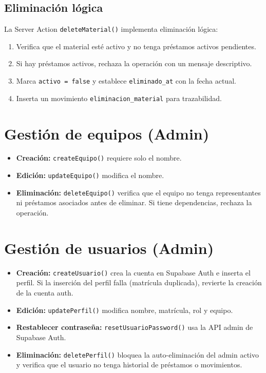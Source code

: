 \documentclass[12pt,a4paper,oneside]{report}
\newcommand{\file}[1]{\texttt{\color{cecyteDark}#1}}
\begin{document}
\subsection{Eliminación lógica}

La Server Action \file{deleteMaterial()} implementa eliminación lógica:

\begin{enumerate}
  \item Verifica que el material esté activo y no tenga préstamos activos pendientes.
  \item Si hay préstamos activos, rechaza la operación con un mensaje descriptivo.
  \item Marca \file{activo = false} y establece \file{eliminado\_at} con la fecha actual.
  \item Inserta un movimiento \file{eliminacion\_material} para trazabilidad.
\end{enumerate}

\section{Gestión de equipos (Admin)}

\begin{itemize}
  \item \textbf{Creación:} \file{createEquipo()} requiere solo el nombre.
  \item \textbf{Edición:} \file{updateEquipo()} modifica el nombre.
  \item \textbf{Eliminación:} \file{deleteEquipo()} verifica que el equipo no tenga representantes ni préstamos asociados antes de eliminar. Si tiene dependencias, rechaza la operación.
\end{itemize}

\section{Gestión de usuarios (Admin)}

\begin{itemize}
  \item \textbf{Creación:} \file{createUsuario()} crea la cuenta en Supabase Auth e inserta el perfil. Si la inserción del perfil falla (matrícula duplicada), revierte la creación de la cuenta auth.
  \item \textbf{Edición:} \file{updatePerfil()} modifica nombre, matrícula, rol y equipo.
  \item \textbf{Restablecer contraseña:} \file{resetUsuarioPassword()} usa la API admin de Supabase Auth.
  \item \textbf{Eliminación:} \file{deletePerfil()} bloquea la auto-eliminación del admin activo y verifica que el usuario no tenga historial de préstamos o movimientos.
\end{itemize}
\end{document}
